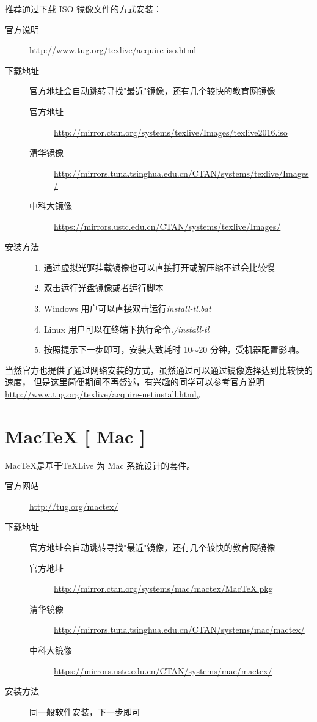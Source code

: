 \documentclass[master,openright,twoside,color,AutoFakeBold=true]{misc/buaathesis}
\begin{document}
推荐通过下载 ISO 镜像文件的方式安装：
\begin{description}
    \item[官方说明]
        \url{http://www.tug.org/texlive/acquire-iso.html}
    \item[下载地址] 官方地址会自动跳转寻找"最近"镜像，还有几个较快的教育网镜像
    \begin{description}
        \item[官方地址]
            \url{http://mirror.ctan.org/systems/texlive/Images/texlive2016.iso}
        \item[清华镜像]
            \url{http://mirrors.tuna.tsinghua.edu.cn/CTAN/systems/texlive/Images/}
        \item[中科大镜像]
            \url{https://mirrors.ustc.edu.cn/CTAN/systems/texlive/Images/}
    \end{description}
    \item[安装方法] \hfill
    \begin{enumerate}
        \item 通过虚拟光驱挂载镜像也可以直接打开或解压缩不过会比较慢
        \item 双击运行光盘镜像或者运行脚本
        \item[] Windows 用户可以直接双击运行\textsl{install-tl.bat}
        \item[] Linux 用户可以在终端下执行命令\textsl{./install-tl}
        \item 按照提示下一步即可，安装大致耗时 10$\sim$20 分钟，受机器配置影响。
    \end{enumerate}
\end{description}

当然官方也提供了通过网络安装的方式，虽然通过可以通过镜像选择达到比较快的速度，
但是这里简便期间不再赘述，有兴趣的同学可以参考官方说明
\url{http://www.tug.org/texlive/acquire-netinstall.html}。

\section{Mac\TeX{} [ Mac ]}

Mac\TeX{}是基于\TeX{}Live 为 Mac 系统设计的套件。

\begin{description}
    \item[官方网站]
        \url{http://tug.org/mactex/}
    \item[下载地址] 官方地址会自动跳转寻找"最近"镜像，还有几个较快的教育网镜像
    \begin{description}
        \item[官方地址]
            \url{http://mirror.ctan.org/systems/mac/mactex/MacTeX.pkg}
        \item[清华镜像]
            \url{http://mirrors.tuna.tsinghua.edu.cn/CTAN/systems/mac/mactex/}
        \item[中科大镜像]
            \url{https://mirrors.ustc.edu.cn/CTAN/systems/mac/mactex/}
    \end{description}
    \item[安装方法] 同一般软件安装，下一步即可
\end{description}
\end{document}

